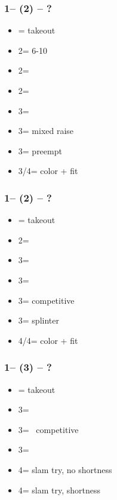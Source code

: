 \documentclass[12pt, a4paper]{report}
\begin{document}
{{{            \subsubsection*{1\hearts -- (2\diams) -- ?}
            \begin{itemize}
                \item \dbl = takeout
                \item 2\hearts = 6-10
                \item 2\spades = \fonce
                \item 2\nt = \clubs\ \invp
                \item 3\clubs = \hearts\ \invp
                \item 3\diams = mixed raise
                \item 3\hearts = preempt
                \item 3\spades/4\clubs = color + fit
            \end{itemize}

            \subsubsection*{1\hearts -- (2\spades) -- ?}
            \begin{itemize}
                \item \dbl = takeout
                \item 2\nt = \clubs\ \invp
                \item 3\clubs = \diams\ \invp
                \item 3\diams = \hearts\ \invp
                \item 3\hearts = competitive
                \item 3\spades = splinter
                \item 4\clubs/4\diams = color + fit
            \end{itemize}

            \subsubsection*{1\hearts -- (3\clubs) -- ?}
            \begin{itemize}
                \item \dbl = takeout
                \item 3\diams = \hearts\ \invp
                \item 3\hearts = \hearts\ competitive
                \item 3\spades = \spades\ \gf
                \item 4\clubs = slam try, no \clubs shortness
                \item 4\diams = slam try, \clubs shortness
            \end{itemize}

}}}
\end{document}
